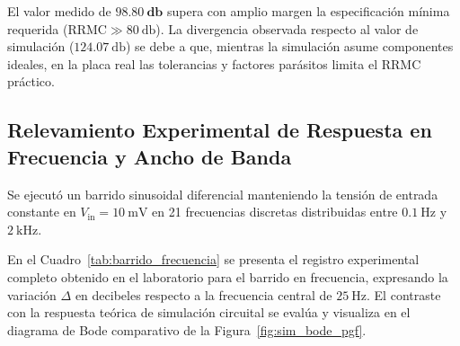 \begin{table}[!ht]
  \centering
  \caption{Comparativa de parámetros de modo diferencial, común y RRMC: valores simulados vs.\ mediciones experimentales en laboratorio.}
  \label{tab:mediciones_rrmc}
\end{table}

El valor medido de $\mathbf{\SI{98.80}{\decibel}}$ supera con amplio margen la
especificación mínima requerida ($\text{RRMC} \gg \SI{80}{\decibel}$). La
divergencia observada respecto al valor de simulación ($\SI{124.07}{\decibel}$)
se debe a que, mientras la simulación asume componentes ideales, en la placa
real las tolerancias y factores parásitos limita el RRMC práctico.

\subsection{Relevamiento Experimental de Respuesta en Frecuencia y Ancho de Banda}
Se ejecutó un barrido sinusoidal diferencial manteniendo la tensión de entrada constante en $V_{\text{in}} = \SI{10}{\milli\volt}$ en 21 frecuencias discretas distribuidas entre $\SI{0.1}{\hertz}$ y $\SI{2}{\kilo\hertz}$.

En el Cuadro~\ref{tab:barrido_frecuencia} se presenta el registro experimental completo obtenido en el laboratorio para el barrido en frecuencia, expresando la variación $\Delta$ en decibeles respecto a la frecuencia central de $\SI{25}{\hertz}$. El contraste con la respuesta teórica de simulación circuital se evalúa y visualiza en el diagrama de Bode comparativo de la Figura~\ref{fig:sim_bode_pgf}.

